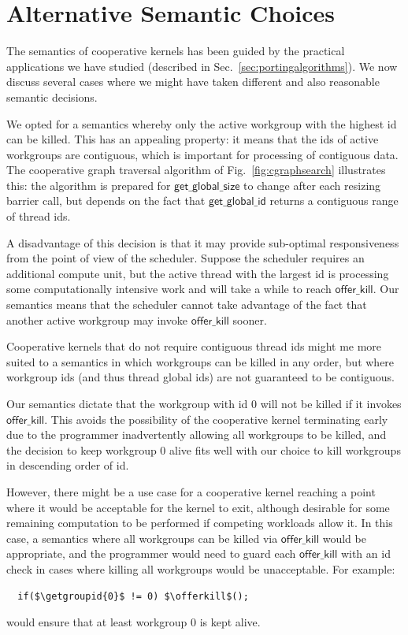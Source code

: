 \documentclass[sigconf]{acmart}
\newcommand{\myfig}{Fig.~}
\newcommand{\mysec}{Sec.~}
\newcommand{\offerkill}{\mathsf{offer\_kill}}
\newcommand{\getgroupid}{\mathsf{get\_group\_id}}
\newcommand{\getglobalid}{\mathsf{get\_global\_id}}
\newcommand{\getglobalsize}{\mathsf{get\_global\_size}}
\begin{document}
{\section{Alternative Semantic Choices}\label{appendix:semanticalternatives}

The semantics of cooperative kernels has been guided by the practical
applications we have studied (described in
\mysec\ref{sec:portingalgorithms}).  We now discuss several cases
where we might have taken different and also reasonable semantic
decisions.

%
We opted for a semantics whereby only the active workgroup with the
highest id can be killed.  This has an appealing property: it means
that the ids of active workgroups are contiguous, which is important
for processing of contiguous data.  The cooperative graph traversal
algorithm of \myfig\ref{fig:cgraphsearch} illustrates this: the
algorithm is prepared for $\getglobalsize$ to change after each
resizing barrier call, but depends on the fact that $\getglobalid$
returns a contiguous range of thread ids.

A disadvantage of this decision is that it may provide sub-optimal
responsiveness from the point of view of the scheduler.  Suppose the
scheduler requires an additional compute unit, but the active thread
with the largest id is processing some computationally intensive work
and will take a while to reach $\offerkill$.  Our semantics means that
the scheduler cannot take advantage of the fact that another active
workgroup may invoke $\offerkill$ sooner.

Cooperative kernels that do not require contiguous thread ids might me
more suited to a semantics in which workgroups can be killed in any
order, but where workgroup ids (and thus thread global ids) are not
guaranteed to be contiguous.

%
Our semantics dictate that the workgroup with id 0 will not be killed
if it invokes $\offerkill$.  This avoids the possibility of the
cooperative kernel terminating early due to the programmer
inadvertently allowing all workgroups to be killed, and the decision
to keep workgroup 0 alive fits well with our choice to kill workgroups
in descending order of id.

However, there might be a use case for a cooperative kernel reaching a
point where it would be acceptable for the kernel to exit, although
desirable for some remaining computation to be performed if competing
workloads allow it.  In this case, a semantics where all workgroups can be killed via $\offerkill$ would be appropriate, and the programmer would need to guard each $\offerkill$ with an id check in cases where killing all workgroups would be unacceptable.  For example:
%
\lstset{basicstyle=\tt,numbers=none}
\begin{lstlisting}
  if($\getgroupid{0}$ != 0) $\offerkill$();
\end{lstlisting}
\lstset{basicstyle=\scriptsize\tt,numbers=left}
%
would ensure that at least workgroup 0 is kept alive.

}
\end{document}
